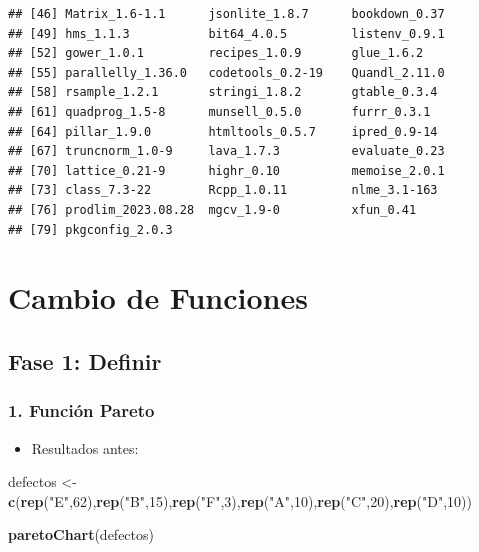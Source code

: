 \documentclass[
]{book}
\newenvironment{Shaded}{\begin{snugshade}}{\end{snugshade}}
\newcommand{\DecValTok}[1]{\textcolor[rgb]{0.00,0.00,0.81}{#1}}
\newcommand{\FunctionTok}[1]{\textcolor[rgb]{0.13,0.29,0.53}{\textbf{#1}}}
\newcommand{\NormalTok}[1]{#1}
\newcommand{\OtherTok}[1]{\textcolor[rgb]{0.56,0.35,0.01}{#1}}
\newcommand{\StringTok}[1]{\textcolor[rgb]{0.31,0.60,0.02}{#1}}
\providecommand{\tightlist}{%
  \setlength{\itemsep}{0pt}\setlength{\parskip}{0pt}}
\begin{document}
\begin{verbatim}
## [46] Matrix_1.6-1.1      jsonlite_1.8.7      bookdown_0.37      
## [49] hms_1.1.3           bit64_4.0.5         listenv_0.9.1      
## [52] gower_1.0.1         recipes_1.0.9       glue_1.6.2         
## [55] parallelly_1.36.0   codetools_0.2-19    Quandl_2.11.0      
## [58] rsample_1.2.1       stringi_1.8.2       gtable_0.3.4       
## [61] quadprog_1.5-8      munsell_0.5.0       furrr_0.3.1        
## [64] pillar_1.9.0        htmltools_0.5.7     ipred_0.9-14       
## [67] truncnorm_1.0-9     lava_1.7.3          evaluate_0.23      
## [70] lattice_0.21-9      highr_0.10          memoise_2.0.1      
## [73] class_7.3-22        Rcpp_1.0.11         nlme_3.1-163       
## [76] prodlim_2023.08.28  mgcv_1.9-0          xfun_0.41          
## [79] pkgconfig_2.0.3
\end{verbatim}

\hypertarget{cambio-de-funciones}{%
\chapter{Cambio de Funciones}\label{cambio-de-funciones}}

\hypertarget{fase-1-definir-1}{%
\section{Fase 1: Definir}\label{fase-1-definir-1}}

\hypertarget{funciuxf3n-pareto}{%
\subsection{1. Función Pareto}\label{funciuxf3n-pareto}}

\begin{itemize}
\tightlist
\item
  Resultados antes:
\end{itemize}

\begin{Shaded}
\begin{Highlighting}[]
\NormalTok{defectos }\OtherTok{\textless{}{-}}\FunctionTok{c}\NormalTok{(}\FunctionTok{rep}\NormalTok{(}\StringTok{"E"}\NormalTok{,}\DecValTok{62}\NormalTok{),}\FunctionTok{rep}\NormalTok{(}\StringTok{"B"}\NormalTok{,}\DecValTok{15}\NormalTok{),}\FunctionTok{rep}\NormalTok{(}\StringTok{"F"}\NormalTok{,}\DecValTok{3}\NormalTok{),}\FunctionTok{rep}\NormalTok{(}\StringTok{"A"}\NormalTok{,}\DecValTok{10}\NormalTok{),}\FunctionTok{rep}\NormalTok{(}\StringTok{"C"}\NormalTok{,}\DecValTok{20}\NormalTok{),}\FunctionTok{rep}\NormalTok{(}\StringTok{"D"}\NormalTok{,}\DecValTok{10}\NormalTok{))}

\FunctionTok{paretoChart}\NormalTok{(defectos)}
\end{Highlighting}
\end{Shaded}
\end{document}

